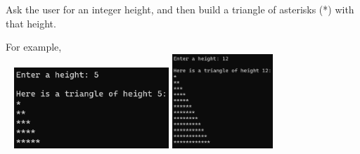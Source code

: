 	\item  
		Ask the user for an integer height, and then build a triangle of asterisks (*) 
		with that height.

		For example, \\ \ \hfill
		\includegraphics[height = 1.2in]{./imgs/triangle1.PNG} \hfill  
		\includegraphics[height = 1.4in]{./imgs/triangle2.PNG} \hfill  \


